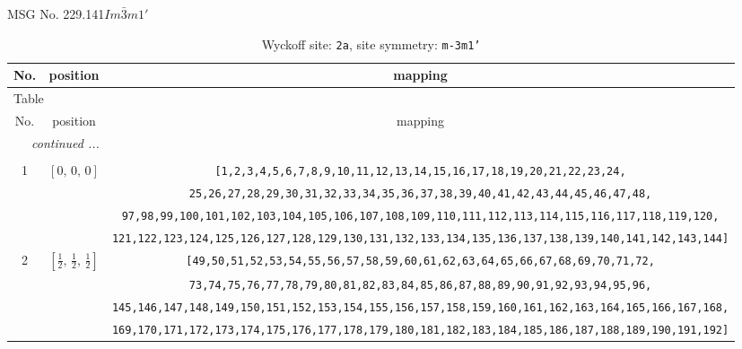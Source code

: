 \documentclass[fleqn,8pt]{jsarticle}
\begin{document}
\setcounter{MaxMatrixCols}{32}

\renewcommand{\tablename}{Table~}
\renewcommand{\figurename}{Figure~}
\begin{center}
\LARGE
MSG No. 229.141\quad$Im\bar{3}m1'$
\end{center}
\renewcommand{\arraystretch}{1.2}
\begin{longtable}{ccc}
\caption{Wyckoff site: {\tt 2a}, site symmetry: {\tt m-3m1'}}
 \\
 \hline \hline
No. & position & mapping \\ \hline \endfirsthead

\multicolumn{2}{l}{\tablename\ \thetable{}} \\
 \hline \hline
No. & position & mapping \\ \hline \endhead

 \hline \hline
\multicolumn{2}{r}{\footnotesize\it continued ...} \\ \endfoot

 \hline \hline
\multicolumn{2}{r}{} \\ \endlastfoot

1 & $\left[ 0,\, 0,\, 0 \right]$ & {\tt [1,2,3,4,5,6,7,8,9,10,11,12,13,14,15,16,17,18,19,20,21,22,23,24,} \\ \hline
 &  & {\tt 25,26,27,28,29,30,31,32,33,34,35,36,37,38,39,40,41,42,43,44,45,46,47,48,} \\ \hline
 &  & {\tt 97,98,99,100,101,102,103,104,105,106,107,108,109,110,111,112,113,114,115,116,117,118,119,120,} \\ \hline
 &  & {\tt 121,122,123,124,125,126,127,128,129,130,131,132,133,134,135,136,137,138,139,140,141,142,143,144]} \\ \hline
2 & $\left[ \frac{1}{2},\, \frac{1}{2},\, \frac{1}{2} \right]$ & {\tt [49,50,51,52,53,54,55,56,57,58,59,60,61,62,63,64,65,66,67,68,69,70,71,72,} \\ \hline
 &  & {\tt 73,74,75,76,77,78,79,80,81,82,83,84,85,86,87,88,89,90,91,92,93,94,95,96,} \\ \hline
 &  & {\tt 145,146,147,148,149,150,151,152,153,154,155,156,157,158,159,160,161,162,163,164,165,166,167,168,} \\ \hline
 &  & {\tt 169,170,171,172,173,174,175,176,177,178,179,180,181,182,183,184,185,186,187,188,189,190,191,192]} \\
\end{longtable}
\renewcommand{\arraystretch}{1.2}
\end{document}
